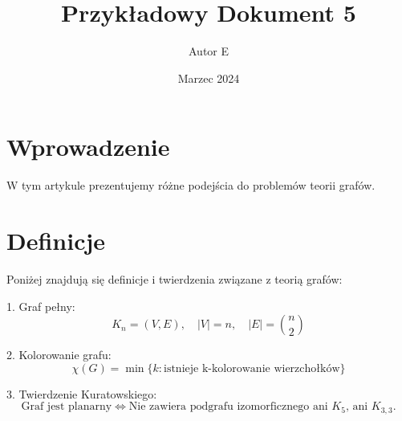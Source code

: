 \documentclass{article}
\title{Przykładowy Dokument 5}
\author{Autor E}
\date{Marzec 2024}
\begin{document}
\maketitle

\section{Wprowadzenie}

W tym artykule prezentujemy różne podejścia do problemów teorii grafów.

\section{Definicje}

Poniżej znajdują się definicje i twierdzenia związane z teorią grafów:

1. Graf pełny:
\[ K_n = (V, E), \quad |V| = n, \quad |E| = \binom{n}{2} \]

2. Kolorowanie grafu:
\[ \chi(G) = \min \{k : \text{istnieje k-kolorowanie wierzchołków}\} \]

3. Twierdzenie Kuratowskiego:
\[ \text{Graf jest planarny} \iff \text{Nie zawiera podgrafu izomorficznego ani $K_5$, ani $K_{3,3}$.} \]
\end{document}
